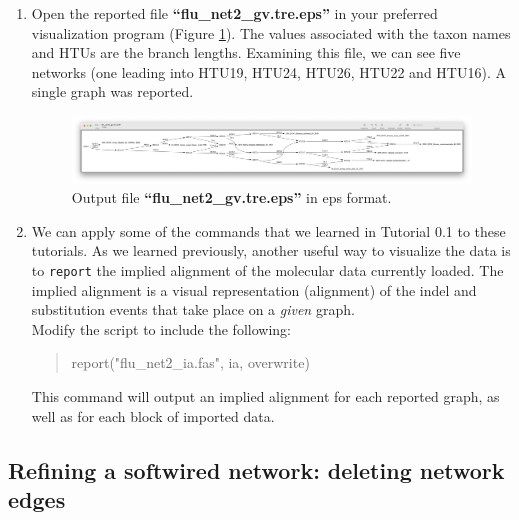 \documentclass[11pt]{article}
\begin{document}
\begin {enumerate}
\item  Open the reported file \textbf{``flu\_net2\_gv.tre.eps''}  in your preferred
visualization program (Figure \ref{eps2}). The values associated with the taxon 
names and HTUs are the branch lengths. Examining this file, we can see five 
networks (one leading into HTU19, HTU24, HTU26, HTU22 and HTU16). A single
graph was reported.

\begin{figure}[H]
\centering
\includegraphics[width=\textwidth]{eps2.png}
\caption{Output file \textbf{``flu\_net2\_gv.tre.eps''} in eps format.}
\label{eps2}
\end{figure}

\item We can apply some of the commands that we learned in Tutorial 0.1 to
these tutorials. As we learned previously, another useful way to visualize the data 
is to \texttt{report} the implied alignment of the molecular data currently loaded. 
The implied alignment is a visual representation (alignment) of the indel and 
substitution events that take place on a \textit{given} graph. \\

Modify the script to include the following: 

\begin{quote}
report("flu\_net2\_ia.fas", ia, overwrite)
\end{quote}

This command will output an implied alignment for each reported graph, as well as 
for each block of imported data. 
%

\end{enumerate}

\subsection{Refining a softwired network: deleting network edges}
\label{subsec:netdel}
\end{document}
